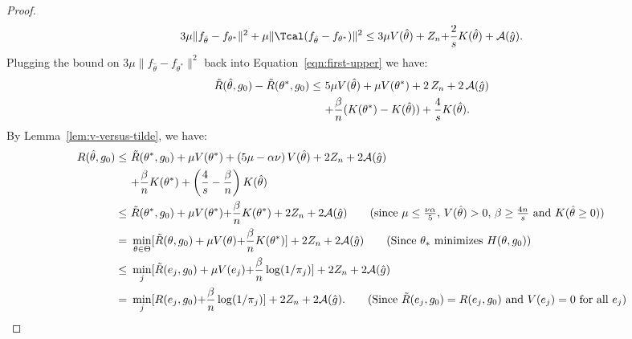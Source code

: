 \documentclass[12pt]{extarticle} %
\begin{document}
\begin{proof}
\begin{align*}
    3\mu \|f_{\hat{\theta}} - f_{\theta^*}\|^2 +\mu \|\Tcal(f_{\hat{\theta}} - f_{\theta^*})\|^2\leq 3\mu V(\hat{\theta}) + Z_n {+ \frac{2}{s} K(\hat{\theta})} + {\cal A}(\hat{g}).
\end{align*}
Plugging the bound on $3\mu\|f_{\hat{\theta}} - f_{\theta^*}\|^2$ back into Equation~\eqref{eqn:first-upper} we have:
\begin{align*}
    \tilde{R}(\hat{\theta}, g_0) - \tilde{R}(\theta^*, g_0) \leq ~& 5\mu V(\hat{\theta}) + \mu V(\theta^*) + 2\, Z_n + 2\,{\cal A}(\hat{g}) \\
    ~& {+\frac{\beta}{n}(K(\theta^*)-K(\hat{\theta})) + \frac{4}{s}K(\hat{\theta})}.
\end{align*}
By Lemma~\ref{lem:v-versus-tilde}, we have:
\begin{align*}
    R(\hat{\theta}, g_0) \leq~& \tilde{R}(\theta^*, g_0) + \mu V(\theta^*)+ \left(5\mu - \alpha\nu\right) V(\hat{\theta}) + 2 Z_n + 2{\cal A}(\hat{g}) \\
    ~& {+\frac{\beta}{n}K(\theta^*) + \left(\frac{4}{s} - \frac{\beta}{n}\right)K(\hat{\theta})}\\
    \leq~& \tilde{R}(\theta^*, g_0) + \mu V(\theta^*) {+ \frac{\beta}{n}K(\theta^*)} + 2 Z_n + 2{\cal A}(\hat{g})   \tag{since $\mu\leq \frac{\nu\alpha}{5}$,  $V(\hat{\theta})>0$, {$\beta \geq \frac{4n}{s}$ and $K(\hat{\theta}\geq 0 )$}}\\
    =~& \min_{\theta\in \Theta} [\tilde{R}(\theta, g_0) + \mu V(\theta){+ \frac{\beta}{n}K(\theta^*)}] + 2 Z_n + 2{\cal A}(\hat{g}) \tag{Since $\theta_*$ minimizes $H(\theta, g_0)$}\\
    \leq~& \min_{j} [\tilde{R}(e_j, g_0) + \mu V(e_{j}) {+ \frac{\beta}{n}\log(1/\pi_j)}]+ 2 Z_n + 2{\cal A}(\hat{g}) \\
    =~& \min_{j} [R(e_j, g_0){+ \frac{\beta}{n} \log(1/\pi_j)}] + 2 Z_n +2{\cal A}(\hat{g}). \tag{Since $\tilde{R}(e_j, g_0)=R(e_j, g_0)$ and $V(e_j)=0$ for all $e_j$}
\end{align*}
\end{proof}
\end{document}
